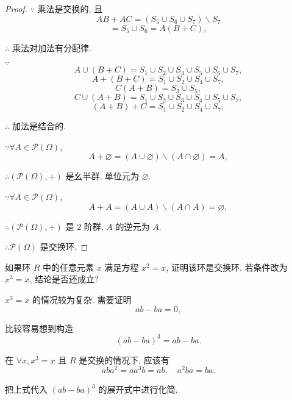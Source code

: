 \documentclass{ctexart}
\begin{document}
\begin{proof}
    $\because$ 乘法是交换的, 且
    \[AB+AC=(S_5\cup S_6\cup S_7)\backslash S_7\]
    \[=S_5\cup S_6=A(B+C),\]

    $\therefore$ 乘法对加法有分配律.

    $\because$
    \[A\cup(B+C)=S_1\cup S_2\cup S_4\cup S_5\cup S_6\cup S_7,\]
    \[A+(B+C)=S_1\cup S_2\cup S_4\cup S_7,\]
    \[C(A+B)=S_3\cup S_5,\]
    \[C\cup(A+B)=S_1\cup S_2\cup S_3\cup S_4\cup S_5\cup S_7,\]
    \[(A+B)+C=S_1\cup S_2\cup S_4\cup S_7,\]

    $\therefore$ 加法是结合的.

    $\because\forall A\in\mathcal{P}(\Omega)$,
    \[A+\varnothing=(A\cup\varnothing)\backslash(A\cap\varnothing)=A,\]

    $\therefore(\mathcal{P}(\Omega),+)$ 是幺半群, 单位元为 $\varnothing$.

    $\because\forall A\in\mathcal{P}(\Omega)$,
    \[A+A=(A\cup A)\backslash(A\cap A)=\varnothing,\]

    $\therefore(\mathcal{P}(\Omega),+)$ 是 $2$ 阶群, $A$ 的逆元为 $A$.

    $\therefore\mathcal{P}(\Omega)$ 是交换环.
\end{proof}
\begin{exercise}[3.2]
    如果环 $R$ 中的任意元素 $x$ 满足方程 $x^2=x$, 证明该环是交换环. 若条件改为 $x^3=x$, 结论是否还成立?
\end{exercise}
\begin{thought}
    $x^3=x$ 的情况较为复杂. 需要证明
    \[ab-ba=0,\]

    比较容易想到构造
    \[(ab-ba)^3=ab-ba.\]

    在 $\forall x,x^3=x$ 且 $R$ 是交换的情况下, 应该有
    \[aba^2=aa^3b=ab,\quad a^2ba=ba.\]

    把上式代入 $(ab-ba)^3$ 的展开式中进行化简.
\end{thought}
\end{document}
